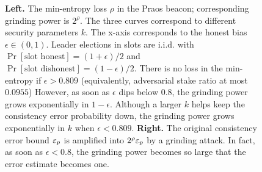 \begin{figure}[!htb]
    \caption[Praos beacon security]{        
        \textbf{Left.} The min-entropy loss $\rho$ in the Praos beacon; 
        corresponding grinding power is $2^\rho$.
        The three curves correspond to different security parameters $k$. 
        The x-axis corresponds to the honest bias $\epsilon \in (0,1)$.  
        Leader elections in slots are i.i.d. 
        with $\Pr[\text{slot honest}]=(1+\epsilon)/2$ and 
        $\Pr[\text{slot dishonest}]=(1-\epsilon)/2$. 
        There is no loss in the min-entropy if $\epsilon > 0.809$ 
        (equivalently, adversarial stake ratio at most $0.0955$) 
        However, as soon as $\epsilon$ dips below $0.8$, 
        the grinding power grows exponentially in $1-\epsilon$.
        Although a larger $k$ helps keep the consistency error probability down, 
        the grinding power grows exponentially in $k$ when $\epsilon < 0.809$.
        \textbf{Right.} The original consistency error bound $\mathsf{\varepsilon}_p$ 
        is amplified into $2^\rho \mathsf{\varepsilon}_p$ by a grinding attack. 
        In fact, as soon as $\epsilon < 0.8$, the grinding power becomes so large that 
        the error estimate becomes one. 
    }
    \label{fig:prbad-praos-beacon}
\end{figure}
